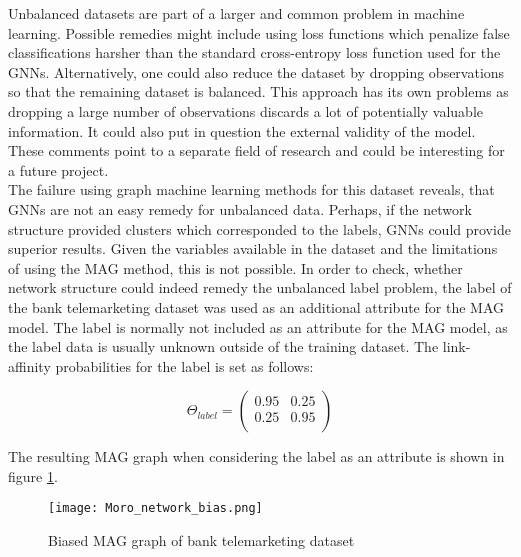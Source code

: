   \noindent Unbalanced datasets are part of a larger and common problem in 
  machine learning. Possible remedies might include using loss functions which 
  penalize false classifications harsher than the standard cross-entropy loss 
  function used for the GNNs. Alternatively, one could also reduce the dataset 
  by dropping observations so that the remaining dataset is balanced. This 
  approach has its own problems as dropping a large number of observations 
  discards a lot of potentially valuable information. It could also put in 
  question the external validity of the model. These comments point to a 
  separate field of research and could be interesting for a future project. \\

  \noindent The failure using graph machine learning methods for this dataset
  reveals, that GNNs are not an easy remedy for unbalanced data. Perhaps, if the
  network structure provided clusters which corresponded to the labels, GNNs
  could provide superior results. Given the variables available in the dataset
  and the limitations of using the MAG method, this is not possible. In order
  to check, whether network structure could indeed remedy the unbalanced label
  problem, the label of the bank telemarketing dataset was used as an
  additional attribute for the MAG model. The label is normally not included as 
  an attribute for the MAG model, as the label data is usually unknown outside 
  of the training dataset. The link-affinity probabilities for the label is set
  as follows:

  \[ \Theta_{label} = 
	\begin{pmatrix}
        0.95 & 0.25 \\
		0.25 & 0.95 \\
	\end{pmatrix}
	\] 
  
  \noindent The resulting MAG graph when considering the label as an attribute 
  is shown in figure \ref{fig:Moro_bias}.

  \begin{figure}[h]
		\centering
		\texttt{[image: Moro\_network\_bias.png]}
		\caption{Biased MAG graph of bank telemarketing dataset}
        \label{fig:Moro_bias}
  \end{figure}

